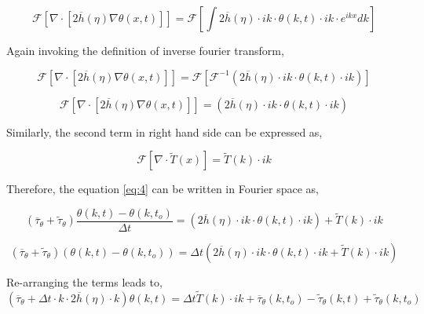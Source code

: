 \documentclass[a4paper,11pt,dvipsnames]{article}
\begin{document}
\begin{equation}
\mathcal{F} \left [ \nabla \cdot \left [ 2 \overline{h}(\eta) \nabla \theta (x,t) \right ] \right ] = 
\mathcal{F} \left [ \int 2 \overline{h} (\eta) \cdot ik \cdot \theta (k,t) \cdot ik \cdot e^{ikx} dk \right ] \label{eq:9}
\end{equation}

Again invoking the definition of inverse fourier transform,

\begin{equation}
\mathcal{F} \left [ \nabla \cdot \left [ 2 \overline{h}(\eta) \nabla \theta (x,t) \right ] \right ] = 
\mathcal{F} \left [ \mathcal{F}^{-1} \left ( 2 \overline{h} (\eta) \cdot ik \cdot \theta (k,t) \cdot ik \right ) \right ] \label{eq:10}
\end{equation}

\begin{equation}
\mathcal{F} \left [ \nabla \cdot \left [ 2 \overline{h}(\eta) \nabla \theta (x,t) \right ] \right ] = 
\left ( 2 \overline{h} (\eta) \cdot ik \cdot \theta (k,t) \cdot ik \right ) \label{eq:11}
\end{equation}

Similarly, the second term in right hand side can be expressed as, 

\begin{equation}
\mathcal{F} \left [ \nabla \cdot \tilde{T}(x) \right ] = 
\tilde{T}(k) \cdot ik \label{eq:12}
\end{equation}

Therefore, the equation \ref{eq:4} can be written in Fourier space as, 

\begin{equation}
\left ( \overline{\tau}_\theta + \tilde{\tau}_\theta \right ) \frac{\theta (k,t) - \theta (k,t_o)}{\Delta t} = \left ( 2 \overline{h} (\eta) \cdot ik \cdot \theta (k,t) \cdot ik \right ) +  \tilde{T}(k) \cdot ik \label{eq:13}
\end{equation}

\begin{equation}
\left ( \overline{\tau}_\theta + \tilde{\tau}_\theta \right )\left ( \theta (k,t) - \theta (k,t_o)\right ) = \Delta t \left ( 2 \overline{h} (\eta) \cdot ik \cdot \theta (k,t) \cdot ik +  \tilde{T}(k) \cdot ik \right ) \label{eq:14}
\end{equation}

Re-arranging the terms leads to, 
\begin{equation}
\left ( \overline{\tau}_\theta + \Delta t \cdot k \cdot 2 \overline{h} (\eta) \cdot k \right ) \theta (k,t) = 
\Delta t \tilde{T}(k) \cdot ik + \overline{\tau}_\theta (k,t_o) - \tilde{\tau}_\theta (k,t) + \tilde{\tau}_\theta (k,t_o) \label{eq:15}
\end{equation}
\end{document}
